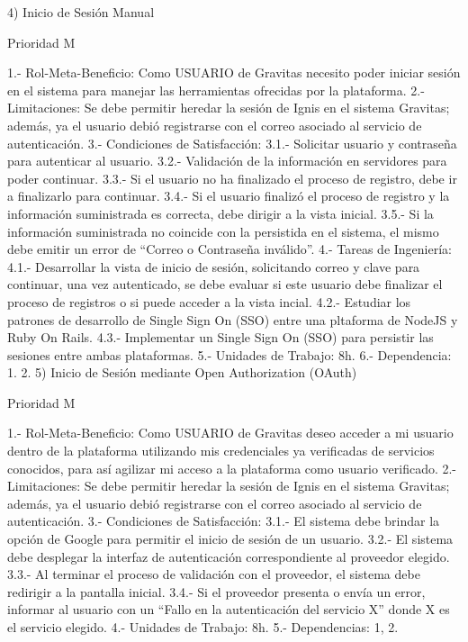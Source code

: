 4) Inicio de Sesión Manual

	Prioridad M

	1.-	Rol-Meta-Beneficio: Como USUARIO de Gravitas necesito poder iniciar sesión en el sistema para manejar las herramientas ofrecidas por la plataforma.
	2.-	Limitaciones:   Se debe permitir heredar la sesión de Ignis en el sistema Gravitas; además, ya el usuario debió registrarse con el correo asociado al servicio de autenticación.
	3.-	Condiciones de Satisfacción:
		3.1.-	Solicitar usuario y contraseña para autenticar al usuario.
		3.2.-	Validación de la información en servidores para poder continuar.
		3.3.-	Si el usuario no ha finalizado el proceso de registro, debe ir a finalizarlo para continuar.
		3.4.-	Si el usuario finalizó el proceso de registro y la información suministrada es correcta, debe dirigir a la vista inicial.
		3.5.-	Si la información suministrada no coincide con la persistida en el sistema, el mismo debe emitir un error de “Correo o Contraseña inválido”.
	4.-	Tareas de Ingeniería:
		4.1.-	Desarrollar la vista de inicio de sesión, solicitando correo y clave para continuar, una vez autenticado, se debe evaluar si este usuario debe finalizar el proceso de registros o si puede acceder a la vista incial.
	4.2.- Estudiar los patrones de desarrollo de Single Sign On (SSO) entre una pltaforma de NodeJS y Ruby On Rails.
	4.3.- Implementar un Single Sign On (SSO) para persistir las sesiones entre ambas plataformas.
	5.-	Unidades de Trabajo: 8h.
	6.- 	Dependencia: 1. 2.
5) Inicio de Sesión mediante Open Authorization (OAuth)
	
Prioridad M

	1.-	Rol-Meta-Beneficio: Como USUARIO de Gravitas deseo acceder a mi usuario dentro de la plataforma utilizando mis credenciales ya verificadas de servicios conocidos, para así agilizar mi acceso a la plataforma como usuario verificado.
	2.-	Limitaciones: Se debe permitir heredar la sesión de Ignis en el sistema Gravitas; además, ya el usuario debió registrarse con el correo asociado al servicio de autenticación.
	3.-	Condiciones de Satisfacción:
		3.1.- El sistema debe brindar la opción de Google para permitir el inicio de sesión de un usuario.
		3.2.-	El sistema debe desplegar la interfaz de autenticación correspondiente al proveedor elegido.
		3.3.-	Al terminar el proceso de validación con el proveedor, el sistema debe redirigir a la pantalla inicial.
		3.4.-	Si el proveedor presenta o envía un error, informar al usuario con un “Fallo en la autenticación del servicio X” donde X es el servicio elegido.
	4.-	Unidades de Trabajo: 8h.
	5.-	Dependencias: 1, 2.

